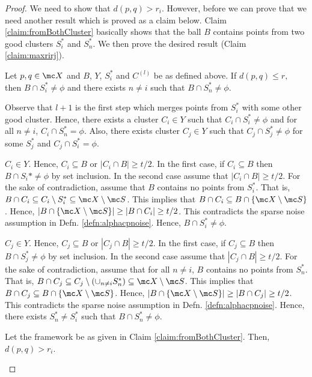 \documentclass[11pt]{article}
\begin{document}
\begin{proof}
We need to show that $d(p, q) > r_i$. However, before we can prove that we need another result which is proved as a claim below. Claim \ref{claim:fromBothCluster} basically shows that the ball $B$ contains points from two good clusters $S_i^*$ and $S_n^*$. We then prove the desired result (Claim \ref{claim:maxrirj}).
\begin{claim}
\label{claim:fromBothCluster}
Let $p, q \in \mc X$ and $B$, $Y$, $S_i^*$ and $C^{(l)}$ be as defined above. If $d(p, q) \le r,$ then $B \cap S_i^* \neq \phi$ and there exists $n \neq i$ such that $B \cap S_n^* \neq \phi$.
\end{claim}
\vspace{-0.1in} Observe that $l+1$ is the first step which merges points from $S_i^*$ with some other good cluster. Hence, there exists a cluster $C_i \in Y$ such that $C_i\cap S_i^*  \neq \phi$ and for all $n \neq i$, $C_i \cap S_n^* = \phi$. Also, there exists cluster $C_j \in Y$ such that $C_j \cap S_j^* \neq \phi$ for some $S_j^*$ and $C_j \cap S_i^* = \phi$.

$C_i \in Y$. Hence, $C_i \subseteq B$ or $|C_i \cap B| \ge t/2$. In the first case, if $C_i \subseteq B$ then $B \cap S_i* \neq \phi$ by set inclusion. In the second case assume that $|C_i \cap B| \ge t/2$. For the sake of contradiction, assume that $B$ contains no points from $S_i^*$. That is, $B \cap C_i \subseteq C_i \setminus S_i^* \subseteq \mc X \setminus \mc S$. This implies that $B \cap C_i \subseteq B \cap \{\mc X \setminus \mc S\}$. Hence, $|B\cap \{\mc X \setminus \mc S\}| \ge |B \cap C_i| \ge t/2$. This contradicts the sparse noise assumption in Defn. \ref{defn:alphacpnoise}. Hence, $B \cap S_i^* \neq \phi$.

$C_j \in Y$. Hence, $C_j \subseteq B$ or $|C_j \cap B| \ge t/2$. In the first case, if $C_j \subseteq B$ then $B \cap S_j^* \neq \phi$ by set inclusion. In the second case assume that $|C_j \cap B| \ge t/2$. For the sake of contradiction, assume that for all $n \neq i$, $B$ contains no points from $S_n^*$. That is, $B \cap C_j \subseteq C_j \setminus (\cup_{n \neq i} S_n^*) \subseteq \mc X \setminus \mc S$. This implies that $B \cap C_j \subseteq B \cap \{\mc X \setminus \mc S\}$. Hence, $|B\cap \{\mc X \setminus \mc S\}| \ge |B \cap C_j| \ge t/2$. This contradicts the sparse noise assumption in Defn. \ref{defn:alphacpnoise}. Hence, there exists $S_n^* \neq S_i^*$ such that $B \cap S_n^* \neq \phi$.

\begin{claim}
\label{claim:maxrirj}
Let the framework be as given in Claim \ref{claim:fromBothCluster}. Then, $d(p, q) > r_i$.
\end{claim}


\end{proof}
\end{document}
